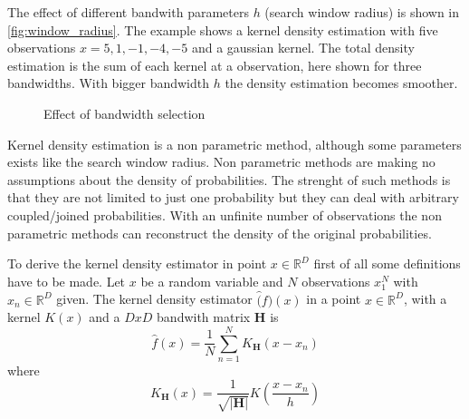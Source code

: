 The effect of different bandwith parameters $h$ (search window radius) is shown in 
\autoref{fig:window_radius}. The example shows a kernel density estimation with
five observations $x = {5, 1, -1, -4, -5}$ and a gaussian kernel. The total
density estimation is the sum of each kernel at a observation, here shown for
three bandwidths. With bigger bandwidth $h$ the density estimation becomes
smoother.

\begin{figure}[ht]
\centering
{}%
%
%
\caption{Effect of bandwidth selection}
\label{fig:window_radius}
\end{figure}

Kernel density estimation is a non parametric method, although some parameters
exists like the search window radius. Non parametric methods are making no
assumptions about the density of probabilities. The strenght of such methods is
that they are not limited to just one probability but they can deal with
arbitrary coupled/joined probabilities. With an unfinite number of observations
the non parametric methods can reconstruct the density of the original
probabilities.

To derive the kernel density estimator in point $x \in \mathbb{R}^D$ first of
all some definitions have to be made. Let $x$ be a random variable and $N$
observations $x_1^N$ with $x_n \in \mathbb{R}^D$ given. The kernel density
estimator $\hat(f)(x)$ in a point $x \in \mathbb{R}^D$, with a kernel $K(x)$ and a
$DxD$ bandwith matrix $\mathbf{H}$ is 
\begin{equation}\label{eq:kernel0}
	\hat{f}(x) = \frac{1}{N} \sum_{n = 1}^N K_{\mathbf{H}}\left( x-x_n \right)
\end{equation} 
where
\begin{equation}\label{eq:kernel1}
	K_{\mathbf{H}}(x) = \frac{1}{\sqrt{|\mathbf{H}|}}K \left( \frac{x - x_n}{h} \right)
\end{equation} 

